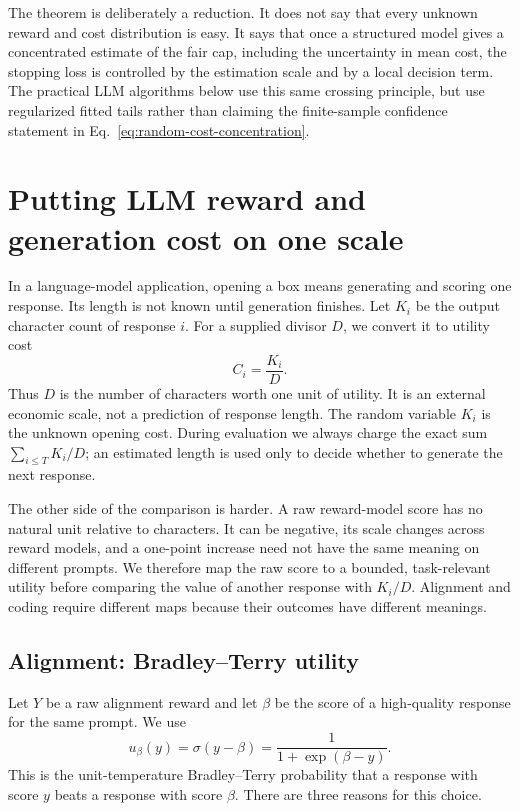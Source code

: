 The theorem is deliberately a reduction.  It does not say that every unknown
reward and cost distribution is easy.  It says that once a structured model
gives a concentrated estimate of the fair cap, including the uncertainty in
mean cost, the stopping loss is controlled by the estimation scale and by a
local decision term.  The practical LLM algorithms below use this same
crossing principle, but use regularized fitted tails rather than claiming the
finite-sample confidence statement in
Eq.~\eqref{eq:random-cost-concentration}.


\section{Putting LLM reward and generation cost on one scale}
\label{sec:calibration}

In a language-model application, opening a box means generating and scoring
one response.  Its length is not known until generation finishes.  Let $K_i$
be the output character count of response $i$.  For a supplied divisor $D$,
we convert it to utility cost
\begin{equation}
  C_i=\frac{K_i}{D}.
  \label{eq:character-cost}
\end{equation}
Thus $D$ is the number of characters worth one unit of utility.  It is an
external economic scale, not a prediction of response length.  The random
variable $K_i$ is the unknown opening cost.  During evaluation we always
charge the exact sum $\sum_{i\le T}K_i/D$; an estimated length is used only to
decide whether to generate the next response.

The other side of the comparison is harder.  A raw reward-model score has no
natural unit relative to characters.  It can be negative, its scale changes
across reward models, and a one-point increase need not have the same meaning
on different prompts.  We therefore map the raw score to a bounded,
task-relevant utility before comparing the value of another response with
$K_i/D$.  Alignment and coding require different maps because their outcomes
have different meanings.

\subsection{Alignment: Bradley--Terry utility}
\label{sec:bt-calibration}

Let $Y$ be a raw alignment reward and let $\beta$ be the score of a
high-quality response for the same prompt.  We use
\begin{equation}
  u_\beta(y)=\sigma(y-\beta)
  =\frac{1}{1+\exp(\beta-y)}.
  \label{eq:bt-map}
\end{equation}
This is the unit-temperature Bradley--Terry probability that a response with
score $y$ beats a response with score $\beta$.  There are three reasons for
this choice.

